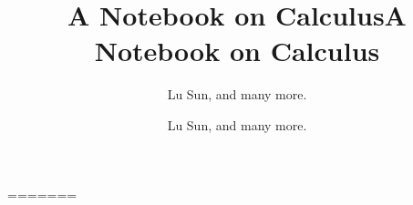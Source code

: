 



\makeindex



\frontmatter

\title{A Notebook on Calculus}
\author{Lu Sun, and many more.}

\maketitle


\tableofcontents


\listoffigures
\listoftables

\mainmatter














\printindex


=======




\makeindex



\frontmatter

\title{A Notebook on Calculus}
\author{Lu Sun, and many more.}

\maketitle


\tableofcontents


\listoffigures
\listoftables

\mainmatter














\printindex


